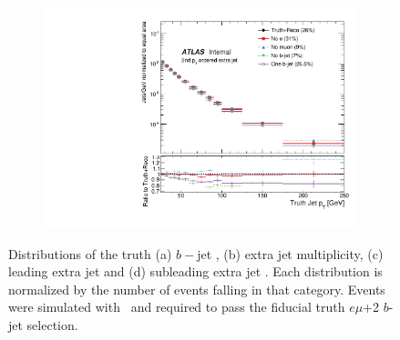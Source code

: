 \begin{figure}
\begin{subfigure}[]{0.45\textwidth}
\end{subfigure}
\begin{subfigure}[]{0.45\textwidth}
\includegraphics[width=\textwidth]{fig/TruthNotReco/TruthPtJet1.pdf}
\end{subfigure}
\caption{Distributions of the truth (a) $b-$jet \pt, (b) extra jet multiplicity, (c) leading extra jet \pt and (d) subleading extra jet \pt. Each distribution is normalized by the number of events falling in that category. Events were simulated with \powpy~\ttbar and required to pass the fiducial truth $e\mu$+2 $b$-jet selection.}
\label{fig:truthnotreco}
\end{figure}


